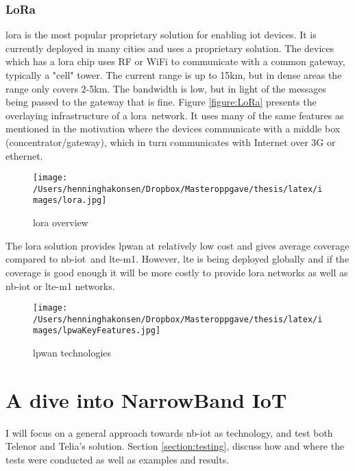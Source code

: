 \documentclass[USenglish]{ifimaster}  %
\begin{document}
\subsection{LoRa}
\acrshort{lora} \cite{online:LoRa} is the most popular proprietary solution for enabling \acrshort{iot} devices. It is currently deployed in many cities and uses a proprietary solution. The devices which has a \acrshort{lora} chip uses RF or WiFi to communicate with a common gateway, typically a "cell" tower. The current range is up to 15km, but in dense areas the range only covers 2-5km. The bandwidth is low, but in light of the messages being passed to the gateway that is fine. Figure \vref{figure:LoRa} presents the overlaying infrastructure of a \acrshort{lora} network. It uses many of the same features as mentioned in the motivation where the devices communicate with a middle box (concentrator/gateway), which in turn communicates with Internet over 3G or ethernet.

\begin{figure}[ht]
  \centering\texttt{[image: /Users/henninghakonsen/Dropbox/Masteroppgave/thesis/latex/images/lora.jpg]}
  \caption[\acrshort{lora} overview]{\acrshort{lora} overview \cite{online:LoRa}}
  \label{figure:LoRa}
\end{figure}

The \acrshort{lora} solution provides \acrshort{lpwan} at relatively low cost and gives average coverage compared to \acrshort{nb-iot} and \acrshort{lte-m1}. However, \acrshort{lte} is being deployed globally and if the coverage is good enough it will be more costly to provide \acrshort{lora} networks as well as \acrshort{nb-iot} or \acrshort{lte-m1} networks.

\begin{figure}[ht!]
  \centering\texttt{[image: /Users/henninghakonsen/Dropbox/Masteroppgave/thesis/latex/images/lpwaKeyFeatures.jpg]}
  \caption[\acrshort{lpwan} technologies]{\acrshort{lpwan} technologies \cite{online:legacyWire}}
  \label{figure:legacyWire}
\end{figure}

\chapter{A dive into NarrowBand IoT} \label{section:nb-iot}

I will focus on a general approach towards \acrshort{nb-iot} as technology, and test both Telenor and Telia's solution. Section \vref{section:testing}, discuss how and where the tests were conducted as well as examples and results.
\end{document}
